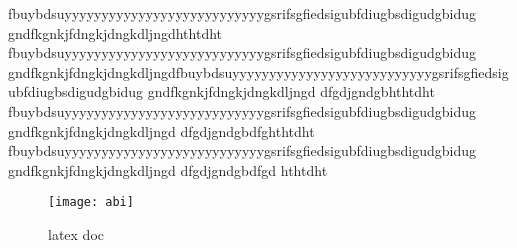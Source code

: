 \documentclass[12pt]{report}
\begin{document}
fbuybdsuyyyyyyyyyyyyyyyyyyyyyyyyyyygsrifsgfiedsigubfdiugbsdigudgbidug
gndfkgnkjfdngkjdngkdljngdhthtdht
fbuybdsuyyyyyyyyyyyyyyyyyyyyyyyyyyygsrifsgfiedsigubfdiugbsdigudgbidug
gndfkgnkjfdngkjdngkdljngdfbuybdsuyyyyyyyyyyyyyyyyyyyyyyyyyyygsrifsgfiedsigubfdiugbsdigudgbidug
gndfkgnkjfdngkjdngkdljngd
dfgdjgndgbhthtdht
fbuybdsuyyyyyyyyyyyyyyyyyyyyyyyyyyygsrifsgfiedsigubfdiugbsdigudgbidug
gndfkgnkjfdngkjdngkdljngd
dfgdjgndgbdfghthtdht
fbuybdsuyyyyyyyyyyyyyyyyyyyyyyyyyyygsrifsgfiedsigubfdiugbsdigudgbidug
gndfkgnkjfdngkjdngkdljngd
dfgdjgndgbdfgd
hthtdht

\begin{SCfigure}[0.1][h]
\texttt{[image: abi]}
\caption{latex doc}
\end{SCfigure}
\end{document}
